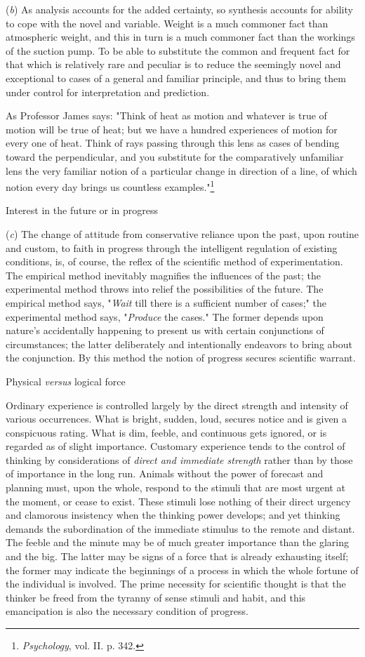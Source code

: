 \documentclass[letterpaper]{book}
\begin{document}
(\emph{b}) As analysis accounts for the added certainty, so synthesis
accounts for ability to cope with the novel and variable. Weight is a
much commoner fact than atmospheric weight, and this in turn is a much
commoner fact than the workings of the suction pump. To be able to
substitute the common and frequent fact for that which is relatively
rare and peculiar is to reduce the seemingly novel and exceptional to
cases of a general and familiar principle, and thus to bring them under
control for interpretation and prediction.

As Professor James says: "Think of heat as motion and whatever is true
of motion will be true of heat; but we have a hundred experiences of
motion for every one of heat. Think of rays passing through this lens as
cases of bending toward the perpendicular, and
you
substitute for the comparatively unfamiliar lens the very familiar
notion of a particular change in direction of a line, of which notion
every day brings us countless
examples."\footnote{\emph{Psychology}, vol. II. p. 342.}

Interest in the future or in progress

(\emph{c}) The change of attitude from conservative reliance upon the
past, upon routine and custom, to faith in progress through the
intelligent regulation of existing conditions, is, of course, the reflex
of the scientific method of experimentation. The empirical method
inevitably magnifies the influences of the past; the experimental method
throws into relief the possibilities of the future. The empirical method
says, "\emph{Wait} till there is a sufficient number of cases;" the
experimental method says, "\emph{Produce} the cases." The former depends
upon nature's accidentally happening to present us with certain
conjunctions of circumstances; the latter deliberately and intentionally
endeavors to bring about the conjunction. By this method the notion of
progress secures scientific warrant.

Physical \emph{versus} logical force

Ordinary experience is controlled largely by the direct strength and
intensity of various occurrences. What is bright, sudden, loud, secures
notice and is given a conspicuous rating. What is dim, feeble, and
continuous gets ignored, or is regarded as of slight importance.
Customary experience tends to the control of thinking by considerations
of \emph{direct and immediate strength} rather than by those of
importance in the long run. Animals without the power of forecast and
planning must, upon the whole, respond to the stimuli that are most
urgent at the moment, or cease to exist. These stimuli lose nothing of
their direct urgency and clamorous insistency when the thinking power
develops; and yet
thinking
demands the subordination of the immediate stimulus to the remote and
distant. The feeble and the minute may be of much greater importance
than the glaring and the big. The latter may be signs of a force that is
already exhausting itself; the former may indicate the beginnings of a
process in which the whole fortune of the individual is involved. The
prime necessity for scientific thought is that the thinker be freed from
the tyranny of sense stimuli and habit, and this emancipation is also
the necessary condition of progress.
\end{document}
